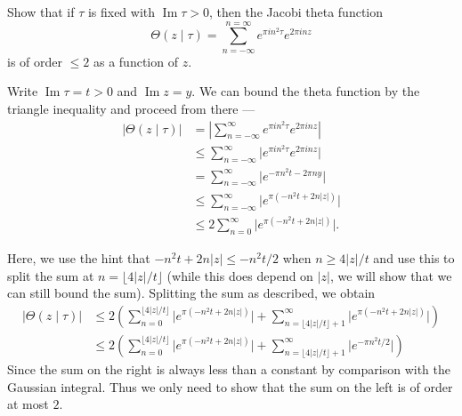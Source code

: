 \documentclass[12 pt, letterpaper]{hmcpset}
\begin{document}
\pagebreak

\begin{problem}[3.]
	Show that if $\tau$ is fixed with $\operatorname{Im} \tau > 0$, then the Jacobi theta function
	\[
		\Theta(z \mid \tau) = \sum_{n = -\infty}^{n = \infty} e^{\pi i n^{2} \tau} e^{2 \pi i n z}
	\]
	is of order $\le 2$ as a function of $z$.
\end{problem}

\begin{solution}
	Write $\operatorname{Im} \tau = t > 0$ and $\operatorname{Im} z = y$. We can bound the theta function by the triangle inequality and proceed from there ---
	\begin{align*}
		\lvert \Theta(z \mid \tau) \rvert & = \left \lvert \sum_{n = - \infty}^{\infty} e^{\pi i n^{2} \tau} e^{2 \pi i n z} \right \rvert \\
						  & \le \sum_{n = -\infty}^{\infty} \lvert e^{\pi i n^{2} \tau} e^{2 \pi i n z} \rvert \\
						  & = \sum_{n = -\infty}^{\infty} \lvert e^{-\pi n^{2} t - 2 \pi n y} \rvert \\
						  & \le \sum_{n = -\infty}^{\infty} \lvert e^{\pi(- n^{2} t + 2 n \lvert z \rvert)} \rvert \\
						  & \le 2 \sum_{n = 0}^{\infty} \lvert e^{\pi(-n^{2} t + 2 n \lvert z \rvert)} \rvert.
	\end{align*}

	Here, we use the hint that $-n^{2} t + 2 n \lvert z \rvert \le - n^{2} t / 2$ when $n \ge 4 \lvert z \rvert / t$ and use this to split the sum at $n = \lfloor 4 \lvert z \rvert / t \rfloor$ (while this does depend on $\lvert z \rvert$, we will show that we can still bound the sum). Splitting the sum as described, we obtain
	\begin{align*}
		\lvert \Theta(z \mid \tau) \rvert & \le 2 \left ( \sum_{n = 0}^{\lfloor 4 \lvert z \rvert / t \rfloor} \lvert e^{\pi (-n^{2} t + 2 n \lvert z \rvert)} \rvert + \sum_{n = \lfloor 4 \lvert z \rvert / t \rfloor + 1}^{\infty} \lvert e^{\pi (-n^{2} t + 2 n \lvert z \rvert)} \rvert \right ) \\
						  & \le 2 \left ( \sum_{n = 0}^{\lfloor 4 \lvert z \rvert / t \rfloor} \lvert e^{\pi (-n^{2} t + 2 n \lvert z \rvert)} \rvert + \sum_{n = \lfloor 4 \lvert z \rvert / t \rfloor + 1}^{\infty} \lvert e^{- \pi n^{2} t/2} \rvert \right )
	\end{align*}
	Since the sum on the right is always less than a constant by comparison with the Gaussian integral. Thus we only need to show that the sum on the left is of order at most $2$.


\end{solution}
\end{document}
